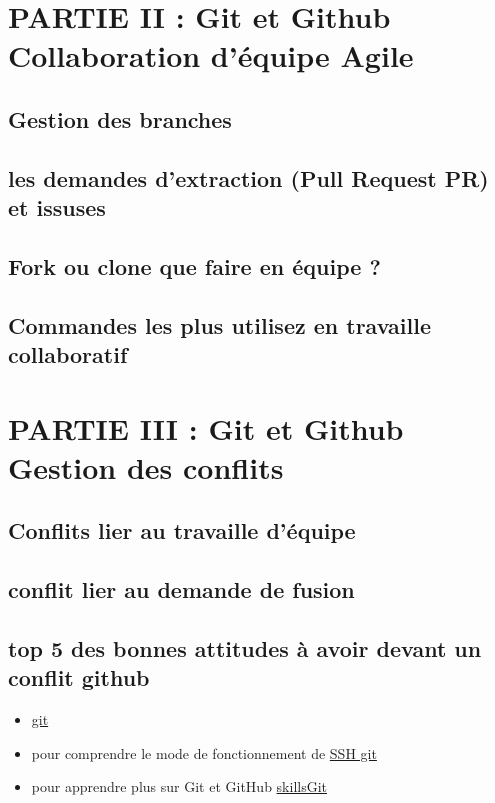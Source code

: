 \documentclass{article}
\begin{document}
	\section{PARTIE II : Git et Github Collaboration d'équipe Agile }
	
	\subsection{Gestion des branches }
	\subsection{les demandes d'extraction (Pull Request PR) et issuses }
	\subsection{Fork ou clone que faire en équipe ? }
	\subsection{Commandes les plus utilisez en travaille collaboratif }
	
 \section{PARTIE III : Git et Github Gestion des conflits  }
 
 \subsection{Conflits lier au travaille d'équipe }
 \subsection{conflit lier au demande de fusion}
 \subsection{top 5 des bonnes attitudes  à avoir devant un conflit github }


	
	 
	
	\begin{itemize} Documentation officiel de \smallskip
		\item  \href{https://git-scm.com/docs/git}{git}
	\end{itemize}
	
	\begin{itemize}
		\item pour comprendre le mode de fonctionnement de \href{https://docs.github.com/en/authentication/connecting-to-github-with-ssh}{SSH git}
	\end{itemize}
	
	\begin{itemize}
		\item pour apprendre plus sur Git et GitHub \href{https://skills.github.com/}{skillsGit}
	\end{itemize}
	
\end{document}
